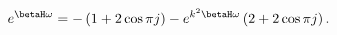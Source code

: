 \begin{equation}
e^{\betaH \omega} = - \left(1 + 2\cos \pi j \right) - e^{k^2 \betaH \omega} \left(2 + 2\cos \pi j\right).
\end{equation}

